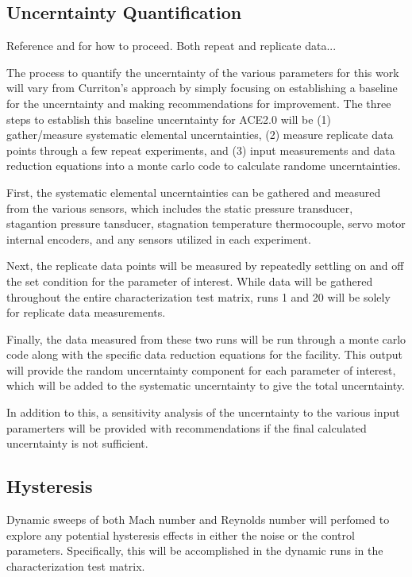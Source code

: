 \subsection{Uncerntainty Quantification}

Reference \cite{stephens-hubbard} and \cite{curriston} for how to proceed. Both repeat and replicate data...

The process to quantify the uncerntainty of the various parameters for this work will vary from Curriton's approach by simply focusing on establishing a baseline for the uncerntainty and making recommendations for improvement. The three steps to establish this baseline uncerntainty for ACE2.0 will be (1) gather/measure systematic elemental uncerntainties, (2) measure replicate data points through a few repeat experiments, and (3) input measurements and data reduction equations into a monte carlo code to calculate randome uncerntainties.

First, the systematic elemental uncerntainties can be gathered and measured from the various sensors, which includes the static pressure transducer, stagantion pressure tansducer, stagnation temperature thermocouple, servo motor internal encoders, and any sensors utilized in each experiment. 

Next, the replicate data points will be measured by repeatedly settling on and off the set condition for the parameter of interest. While data will be gathered throughout the entire characterization test matrix, runs 1 and 20 will be solely for replicate data measurements. 

Finally, the data measured from these two runs will be run through a monte carlo code along with the specific data reduction equations for the facility. This output will provide the random uncerntainty component for each parameter of interest, which will be added to the systematic uncerntainty to give the total uncerntainty.

In addition to this, a sensitivity analysis of the uncerntainty to the various input paramerters will be provided with recommendations if the final calculated uncerntainty is not sufficient.

\subsection{Hysteresis}

Dynamic sweeps of both Mach number and Reynolds number will perfomed to explore any potential hysteresis effects in either the noise or the control parameters. Specifically, this will be accomplished in the dynamic runs in the characterization test matrix.

